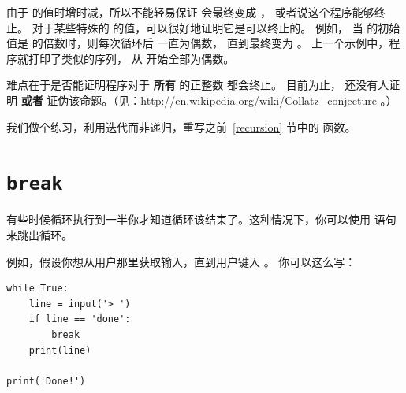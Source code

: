 由于  的值时增时减，所以不能轻易保证  会最终变成 ， 或者说这个程序能够终止。 对于某些特殊的  的值，可以很好地证明它是可以终止的。 例如， 当  的初始值是  的倍数时，则每次循环后  一直为偶数， 直到最终变为 。 上一个示例中，程序就打印了类似的序列， 从  开始全部为偶数。


难点在于是否能证明程序对于 {\bf 所有} 的正整数  都会终止。 目前为止，
还没有人证明 {\bf 或者} 证伪该命题。（见：\url{http://en.wikipedia.org/wiki/Collatz_conjecture} 。）


我们做个练习，利用迭代而非递归，重写之前~\ref{recursion} 节中的  函数。

\section{{\tt break} }
  


有些时候循环执行到一半你才知道循环该结束了。这种情况下，你可以使用  语句来跳出循环。


例如，假设你想从用户那里获取输入，直到用户键入 。 你可以这么写：

\begin{lstlisting}
while True:
    line = input('> ')
    if line == 'done':
        break
    print(line)

print('Done!')
\end{lstlisting}

%


